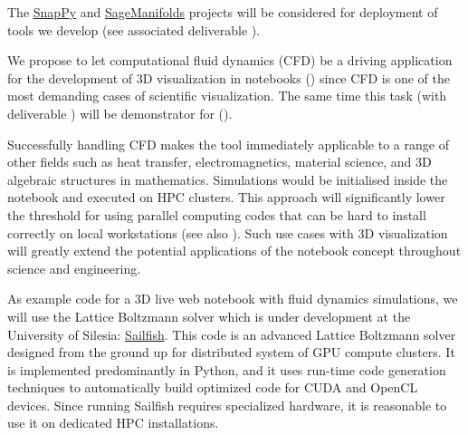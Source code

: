 \begin{workpackage}
\begin{tasklist}
\begin{task}[title=Visualization system for 3D data in web-notebook
,id=vis3d,lead=SR, partners={US,PS,USO}, PM=13, wphases=0-24]
The \href{http://www.math.uic.edu/t3m/SnapPy/}{SnapPy} and
\href{http://sagemanifolds.obspm.fr/}{SageManifolds} projects will be
considered for deployment of tools we develop (see associated
deliverable ).
\end{task}


\begin{task}[title=Visualization of 3D fluid dynamics data in web-notebook
,id=cfd-vis,lead=SR, partners={US,PS,USO},PM=5,wphases=12-36]

We propose to let computational fluid dynamics (CFD) be a driving
application for the development of 3D visualization in \Jupyter
notebooks () since CFD is one of the most demanding
cases of scientific visualization. The same time this task
(with deliverable ) will be
demonstrator for ().

Successfully handling CFD makes the tool immediately applicable to a
range of other fields such as heat transfer, electromagnetics,
material science, and 3D algebraic structures in
mathematics. Simulations would be initialised inside the notebook and
executed on HPC clusters. This approach will significantly lower the
threshold for using parallel computing codes that can be hard to
install correctly on local workstations (see also ). Such
use cases with 3D visualization will greatly extend the potential
applications of the \Jupyter notebook concept throughout science and
engineering.

As example code for a 3D live web notebook with fluid dynamics
simulations, we will use the Lattice Boltzmann solver which is under
development at the University of Silesia:
\href{http://sailfish.us.edu.pl/}{Sailfish}.  This code is an advanced
Lattice Boltzmann solver designed from the ground up for distributed
system of GPU compute clusters. It is implemented predominantly in
Python, and it uses run-time code generation techniques to
automatically build optimized code for CUDA and OpenCL devices. Since
running Sailfish requires specialized hardware, it is reasonable to
use it on dedicated HPC installations.
\end{task}

\begin{task}[lead=UB,title=Common option system for various displays
  in Sage,id=Sage-display,PM=12,wphases=0-24]


\end{task}
\end{tasklist}
\end{workpackage}
